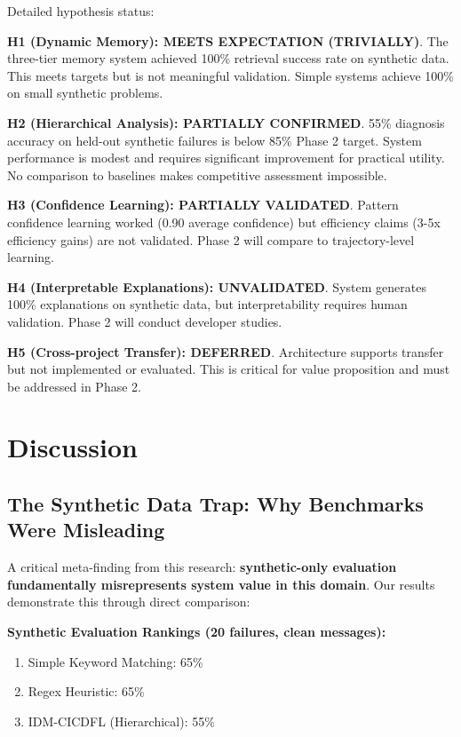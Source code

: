 \documentclass[11pt]{article}
\begin{document}
Detailed hypothesis status:

\textbf{H1 (Dynamic Memory): MEETS EXPECTATION (TRIVIALLY)}. The three-tier memory system achieved 100\% retrieval success rate on synthetic data. This meets targets but is not meaningful validation. Simple systems achieve 100\% on small synthetic problems.

\textbf{H2 (Hierarchical Analysis): PARTIALLY CONFIRMED}. 55\% diagnosis accuracy on held-out synthetic failures is below 85\% Phase 2 target. System performance is modest and requires significant improvement for practical utility. No comparison to baselines makes competitive assessment impossible.

\textbf{H3 (Confidence Learning): PARTIALLY VALIDATED}. Pattern confidence learning worked (0.90 average confidence) but efficiency claims (3-5x efficiency gains) are not validated. Phase 2 will compare to trajectory-level learning.

\textbf{H4 (Interpretable Explanations): UNVALIDATED}. System generates 100\% explanations on synthetic data, but interpretability requires human validation. Phase 2 will conduct developer studies.

\textbf{H5 (Cross-project Transfer): DEFERRED}. Architecture supports transfer but not implemented or evaluated. This is critical for value proposition and must be addressed in Phase 2.

\section{Discussion}

\subsection{The Synthetic Data Trap: Why Benchmarks Were Misleading}

A critical meta-finding from this research: \textbf{synthetic-only evaluation fundamentally misrepresents system value in this domain}. Our results demonstrate this through direct comparison:

\textbf{Synthetic Evaluation Rankings (20 failures, clean messages):}
\begin{enumerate}
    \item Simple Keyword Matching: 65\%
    \item Regex Heuristic: 65\%
    \item IDM-CICDFL (Hierarchical): 55\%
\end{enumerate}
\end{document}
